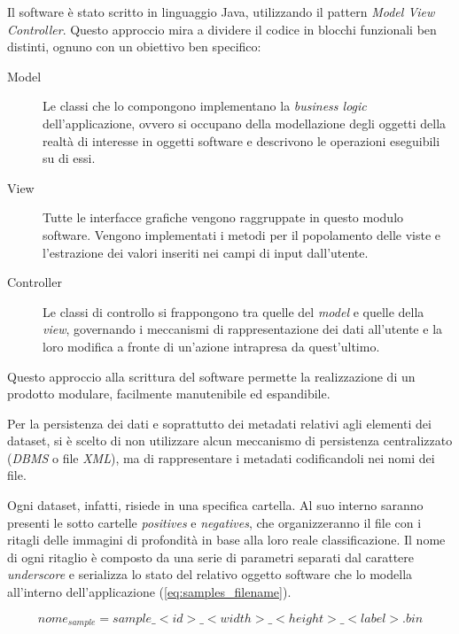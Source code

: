     Il software è stato scritto in linguaggio Java, utilizzando il pattern \emph{Model View Controller}.
    Questo approccio mira a dividere il codice in blocchi funzionali ben distinti, ognuno con un obiettivo ben specifico:
    \begin{description}
        \item[Model] Le classi che lo compongono implementano la \emph{business logic} dell'applicazione, ovvero si occupano della modellazione degli oggetti della realtà di interesse in oggetti software e descrivono le operazioni eseguibili su di essi.

        \item[View] Tutte le interfacce grafiche vengono raggruppate in questo modulo software. Vengono implementati i metodi per il popolamento delle viste e l'estrazione dei valori inseriti nei campi di input dall'utente.

        \item[Controller] Le classi di controllo si frappongono tra quelle del \emph{model} e quelle della \emph{view}, governando i meccanismi di rappresentazione dei dati all'utente e la loro modifica a fronte di un'azione intrapresa da quest'ultimo.
    \end{description}

    Questo approccio alla scrittura del software permette la realizzazione di un prodotto modulare, facilmente manutenibile ed espandibile.

    Per la persistenza dei dati e soprattutto dei metadati relativi agli elementi dei dataset, si è scelto di non utilizzare alcun meccanismo di persistenza centralizzato (\emph{DBMS} o file \emph{XML}), ma di rappresentare i metadati codificandoli nei nomi dei file.

    Ogni dataset, infatti, risiede in una specifica cartella.
    Al suo interno saranno presenti le sotto cartelle \emph{positives} e \emph{negatives}, che organizzeranno il file con i ritagli delle immagini di profondità in base alla loro reale classificazione.
    Il nome di ogni ritaglio è composto da una serie di parametri separati dal carattere \emph{underscore} e serializza lo stato del relativo oggetto software che lo modella all'interno dell'applicazione (\ref{eq:samples_filename}).

    \begin{equation}
        \label{eq:samples_filename}
        nome_{sample} = sample\_<id>\_<width>\_<height>\_<label>.bin
    \end{equation}
    
